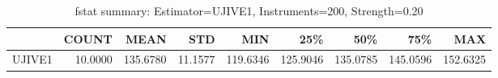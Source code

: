 \begin{table}[ht]
\centering
\caption{fstat summary: Estimator=UJIVE1, Instruments=200, Strength=0.20}
\begin{tabular}{lrrrrrrrr}
\toprule
 & COUNT & MEAN & STD & MIN & 25\% & 50\% & 75\% & MAX \\
\midrule
UJIVE1 & 10.0000 & 135.6780 & 11.1577 & 119.6346 & 125.9046 & 135.0785 & 145.0596 & 152.6325 \\
\bottomrule
\end{tabular}
\end{table}
